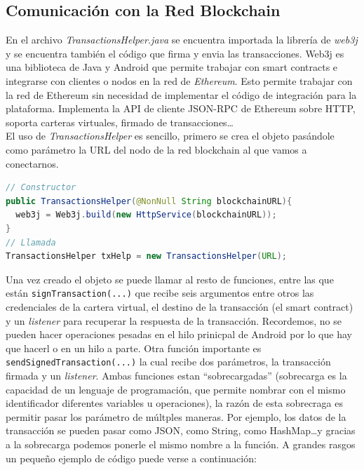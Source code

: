 \subsection{Comunicación con la Red Blockchain}
En el archivo \emph{TransactionsHelper.java} se encuentra importada la librería de \emph{web3j} y se encuentra también el código que firma y envia las transacciones. Web3j es una biblioteca de Java y Android que permite trabajar con smart contracts e integrarse con clientes o nodos en la red de \emph{Ethereum}. Esto permite trabajar con la red de Ethereum sin necesidad de implementar el código de integración para la plataforma. Implementa la API de cliente JSON-RPC de Ethereum sobre HTTP, soporta carteras virtuales, firmado de transacciones\dots \\

El uso de \emph{TransactionsHelper} es sencillo, primero se crea el objeto pasándole como parámetro la URL del nodo de la red blockchain al que vamos a conectarnos.
\begin{lstlisting}[language=Java,float=ht,caption={[Java] Constructor de TransactionsHelper},label=lst:constructor]
// Constructor
public TransactionsHelper(@NonNull String blockchainURL){
  web3j = Web3j.build(new HttpService(blockchainURL));
}
// Llamada 
TransactionsHelper txHelp = new TransactionsHelper(URL);
\end{lstlisting}

Una vez creado el objeto se puede llamar al resto de funciones, entre las que están \verb|signTransaction(...)| que recibe seis argumentos entre otros las credenciales de la cartera virtual, el destino de la transacción (el smart contract) y un \emph{listener} para recuperar la respuesta de la transacción. Recordemos, no se pueden hacer operaciones pesadas en el hilo prinicpal de Android por lo que hay que hacerl o en un hilo a parte. Otra función importante es \verb|sendSignedTransaction(...)| la cual recibe dos parámetros, la transacción firmada y un \emph{listener}. Ambas funciones estan ``sobrecargadas'' (sobrecarga es la capacidad de un lenguaje de programación, que permite nombrar con el mismo identificador diferentes variables u operaciones), la razón de esta sobrecraga es permitir pasar los parámetro de múltples maneras. Por ejemplo, los datos de la transacción se pueden pasar como JSON, como String, como HashMap\dots y gracias a la sobrecarga podemos ponerle el mismo nombre a la función. A grandes rasgos un pequeño ejemplo de código puede verse a continuación: 

